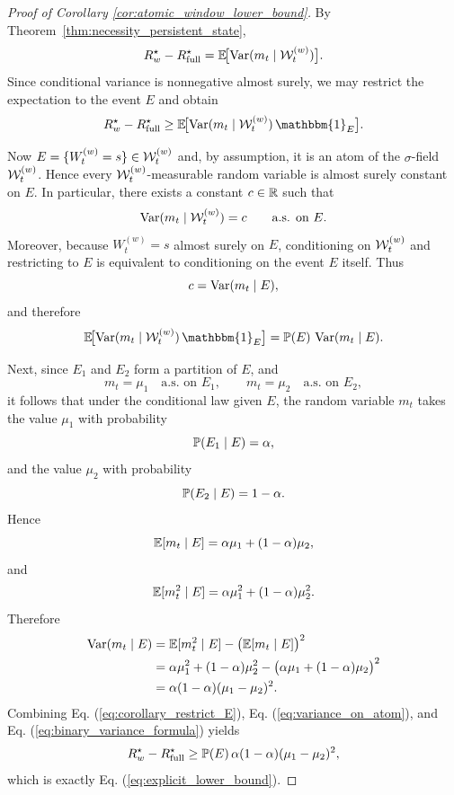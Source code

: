 \begin{proof}[Proof of Corollary \ref{cor:atomic_window_lower_bound}]
By Theorem~\ref{thm:necessity_persistent_state},
\begin{equation}
R_w^\star - R_{\mathrm{full}}^\star
=
\mathbb{E}\!\bigl[\operatorname{Var}(m_t\mid \mathcal{W}_t^{(w)})\bigr].
\label{eq:corollary_start}
\end{equation}
Since conditional variance is nonnegative almost surely, we may restrict the expectation to the event $E$ and obtain
\begin{equation}
R_w^\star - R_{\mathrm{full}}^\star
\ge
\E\!\bigl[\Var(m_t\mid \cW_t^{(w)})\,\mathbbm{1}_E\bigr].
\label{eq:corollary_restrict_E}
\end{equation}

Now $E=\{W_t^{(w)}=s\}\in \mathcal{W}_t^{(w)}$ and, by assumption, it is an atom of the $\sigma$-field $\mathcal{W}_t^{(w)}$.
Hence every $\mathcal{W}_t^{(w)}$-measurable random variable is almost surely constant on $E$.
In particular, there exists a constant $c\in\mathbb{R}$ such that
\[
\operatorname{Var}(m_t\mid \mathcal{W}_t^{(w)}) = c
\qquad \text{a.s. on } E.
\]
Moreover, because $W_t^{(w)}=s$ almost surely on $E$, conditioning on $\mathcal{W}_t^{(w)}$ and restricting to $E$ is equivalent to conditioning on the event $E$ itself. Thus
\[
c = \operatorname{Var}(m_t\mid E),
\]
and therefore
\begin{equation}
\E\!\bigl[\Var(m_t\mid \cW_t^{(w)})\,\mathbbm{1}_E\bigr]
=
\Prob(E)\,\Var(m_t\mid E).
\label{eq:variance_on_atom}
\end{equation}

Next, since $E_1$ and $E_2$ form a partition of $E$, and
\[
m_t=\mu_1 \quad \text{a.s. on } E_1,
\qquad
m_t=\mu_2 \quad \text{a.s. on } E_2,
\]
it follows that under the conditional law given $E$, the random variable $m_t$ takes the value $\mu_1$ with probability
\[
\mathbb{P}(E_1\mid E)=\alpha,
\]
and the value $\mu_2$ with probability
\[
\mathbb{P}(E_2\mid E)=1-\alpha.
\]
Hence
\[
\mathbb{E}[m_t\mid E] = \alpha \mu_1 + (1-\alpha)\mu_2,
\]
and
\[
\mathbb{E}[m_t^2\mid E] = \alpha \mu_1^2 + (1-\alpha)\mu_2^2.
\]
Therefore
\begin{align}
\operatorname{Var}(m_t\mid E)
&=
\mathbb{E}[m_t^2\mid E] - \bigl(\mathbb{E}[m_t\mid E]\bigr)^2
\nonumber\\
&=
\alpha\mu_1^2 + (1-\alpha)\mu_2^2
-
\bigl(\alpha \mu_1 + (1-\alpha)\mu_2\bigr)^2
\nonumber\\
&=
\alpha(1-\alpha)(\mu_1-\mu_2)^2.
\label{eq:binary_variance_formula}
\end{align}
Combining Eq. (\ref{eq:corollary_restrict_E}), Eq. (\ref{eq:variance_on_atom}), and Eq. (\ref{eq:binary_variance_formula}) yields
\[
R_w^\star - R_{\mathrm{full}}^\star
\ge
\mathbb{P}(E)\,\alpha(1-\alpha)(\mu_1-\mu_2)^2,
\]
which is exactly Eq. (\ref{eq:explicit_lower_bound}).
\end{proof}











